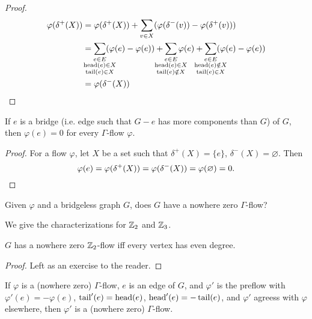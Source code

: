 \documentclass[main.tex]{subfiles}
\begin{document}
\begin{proof}
  \leavevmode\vspace{-0.25em}
  \begin{align*}
    \varphi(\delta^+(X))
    &= \varphi(\delta^+(X)) + \sum_{v \in X} (\varphi(\delta^-(v)) - \varphi(\delta^+(v))) \\
    &= \sum_{\mathclap{\substack{e\in E\\\opname{head}(e)\in X\\\opname{tail}(e)\in X}}}
          (\varphi(e) - \varphi(e))
    + \sum_{\mathclap{\substack{e\in E\\\opname{head}(e)\in X\\\opname{tail}(e)\notin X}}} \varphi(e)
    + \sum_{\mathclap{\substack{e\in E\\\opname{head}(e)\notin X\\\opname{tail}(e)\in X}}}
          (\varphi(e) - \varphi(e))\\
    &= \varphi(\delta^-(X)) \qedhere
  \end{align*}
\end{proof}
\begin{corollary}
  If $e$ is a bridge (i.e. edge such that $G-e$ has more components than $G$)
  of $G$, then $\varphi(e) = 0$ for every $\Gamma$-flow $\varphi$.
\end{corollary}
\begin{proof}
  For a flow $\varphi$, let $X$ be a set such that $\delta^+(X)  = \{e\}$,
  $\delta^-(X) = \varnothing$.
  Then
  \[
    \varphi(e) = \varphi(\delta^+(X)) = \varphi(\delta^-(X)) = \varphi(\varnothing)= 0.
    \qedhere
  \]
\end{proof}
\begin{question*}
  Given $\varphi$ and a bridgeless graph $G$, does $G$ have a nowhere zero
  $\Gamma$-flow?
\end{question*}
We give the characterizations for $\mathbb Z_2$ and $\mathbb Z_3$.
\begin{proposition}
  $G$ has a nowhere zero $\mathbb Z_2$-flow iff every vertex has even degree.
\end{proposition}
\begin{proof}
  Left as an exercise to the reader.
\end{proof}
\begin{lemma}
  If $\varphi$ is a (nowhere zero) $\Gamma$-flow, $e$ is an edge of $G$,
  and $\varphi'$ is the preflow with $\varphi'(e) = -\varphi(e)$,
  $\operatorname{tail}'(e) = \operatorname{head}(e)$, $\operatorname{head}'(e) = -\operatorname{tail}(e)$,
  and $\varphi'$ agreess with $\varphi$ elsewhere, then $\varphi'$ is a (nowhere zero)
  $\Gamma$-flow.
\end{lemma}
\end{document}
